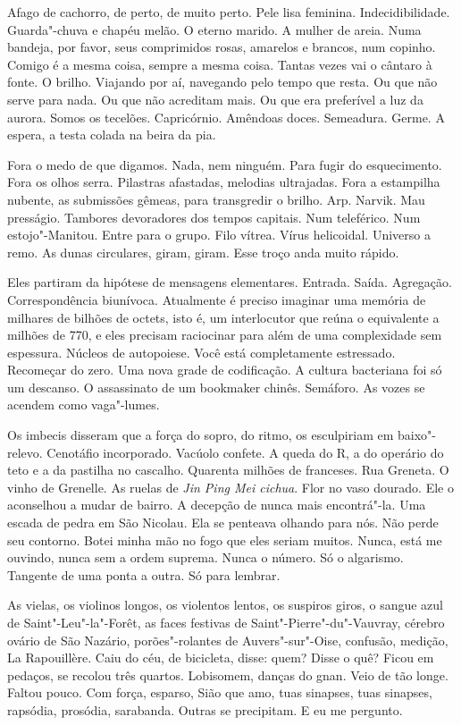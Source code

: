 Afago de cachorro, de perto, de muito perto. Pele lisa feminina.
Indecidibilidade. Guarda"-chuva e chapéu melão. O eterno marido. A mulher
de areia. Numa bandeja, por favor, seus comprimidos rosas, amarelos e
brancos, num copinho. Comigo é a mesma coisa, sempre a mesma coisa.
Tantas vezes vai o cântaro à fonte. O brilho. Viajando por aí, navegando
pelo tempo que resta. Ou que não serve para nada. Ou que não acreditam
mais. Ou que era preferível a luz da aurora. Somos os tecelões.
Capricórnio. Amêndoas doces. Semeadura. Germe. A espera, a testa colada
na beira da pia.

Fora o medo de que digamos. Nada, nem ninguém. Para fugir do
esquecimento. Fora os olhos serra. Pilastras afastadas, melodias
ultrajadas. Fora a estampilha nubente, as submissões gêmeas, para
transgredir o brilho. Arp. Narvik. Mau presságio. Tambores devoradores
dos tempos capitais. Num teleférico. Num estojo"-Manitou. Entre para o
grupo. Filo vítrea. Vírus helicoidal. Universo a remo. As dunas
circulares, giram, giram. Esse troço anda muito rápido.

Eles partiram da hipótese de mensagens elementares. Entrada. Saída.
Agregação. Correspondência biunívoca. Atualmente é preciso imaginar uma
memória de milhares de bilhões de octets, isto é, um interlocutor que
reúna o equivalente a milhões de  770, e eles precisam raciocinar
para além de uma complexidade sem espessura. Núcleos de autopoiese. Você
está completamente estressado. Recomeçar do zero. Uma nova grade de
codificação. A cultura bacteriana foi só um descanso. O assassinato de
um bookmaker chinês. Semáforo. As vozes se acendem como vaga"-lumes.

Os imbecis disseram que a força do sopro, do ritmo, os esculpiriam em
baixo"-relevo. Cenotáfio incorporado. Vacúolo confete. A queda do R, a do
operário do teto e a da pastilha no cascalho. Quarenta milhões de
franceses. Rua Greneta. O vinho de Grenelle. As ruelas de \emph{Jin Ping
Mei cichua}. Flor no vaso dourado. Ele o aconselhou a mudar de bairro. A
decepção de nunca mais encontrá"-la. Uma escada de pedra em São Nicolau.
Ela se penteava olhando para nós. Não perde seu contorno. Botei minha
mão no fogo que eles seriam muitos. Nunca, está me ouvindo, nunca sem a
ordem suprema. Nunca o número. Só o algarismo. Tangente de uma ponta a
outra. Só para lembrar.

As vielas, os violinos longos, os violentos lentos, os suspiros giros, o
sangue azul de Saint"-Leu"-la"-Forêt, as faces festivas de
Saint"-Pierre"-du"-Vauvray, cérebro ovário de São Nazário, porões"-rolantes
de Auvers"-sur"-Oise, confusão, medição, La Rapouillère. Caiu do céu, de
bicicleta, disse: quem? Disse o quê? Ficou em pedaços, se recolou três
quartos. Lobisomem, danças do gnan. Veio de tão longe. Faltou pouco. Com
força, esparso, Sião que amo, tuas sinapses, tuas sinapses, rapsódia,
prosódia, sarabanda. Outras se precipitam. E eu me pergunto.

